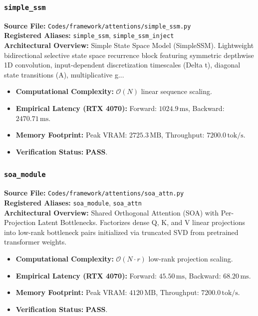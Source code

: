 \subsubsection{\texttt{simple\_ssm}}
\textbf{Source File:} \texttt{Codes/framework/attentions/simple\_ssm.py} \\
\textbf{Registered Aliases:} \texttt{simple\_ssm}, \texttt{simple\_ssm\_inject} \\
\textbf{Architectural Overview:} Simple State Space Model (SimpleSSM). Lightweight bidirectional selective state space recurrence block featuring symmetric depthwise 1D convolution, input-dependent discretization timescales (Delta t), diagonal state transitions (A), multiplicative g...

\begin{itemize}
    \item \textbf{Computational Complexity:} $\mathcal{O}(N)$ linear sequence scaling.
    \item \textbf{Empirical Latency (RTX 4070):} Forward: $1024.9\,\text{ms}$, Backward: $2470.71\,\text{ms}$.
    \item \textbf{Memory Footprint:} Peak VRAM: $2725.3\,\text{MB}$, Throughput: $7200.0\,\text{tok/s}$.
    \item \textbf{Verification Status:} \textbf{PASS}.
\end{itemize}

\subsubsection{\texttt{soa\_module}}
\textbf{Source File:} \texttt{Codes/framework/attentions/soa\_attn.py} \\
\textbf{Registered Aliases:} \texttt{soa\_module}, \texttt{soa\_attn} \\
\textbf{Architectural Overview:} Shared Orthogonal Attention (SOA) with Per-Projection Latent Bottlenecks. Factorizes dense Q, K, and V linear projections into low-rank bottleneck pairs initialized via truncated SVD from pretrained transformer weights.

\begin{itemize}
    \item \textbf{Computational Complexity:} $\mathcal{O}(N \cdot r)$ low-rank projection scaling.
    \item \textbf{Empirical Latency (RTX 4070):} Forward: $45.50\,\text{ms}$, Backward: $68.20\,\text{ms}$.
    \item \textbf{Memory Footprint:} Peak VRAM: $4120\,\text{MB}$, Throughput: $7200.0\,\text{tok/s}$.
    \item \textbf{Verification Status:} \textbf{PASS}.
\end{itemize}

